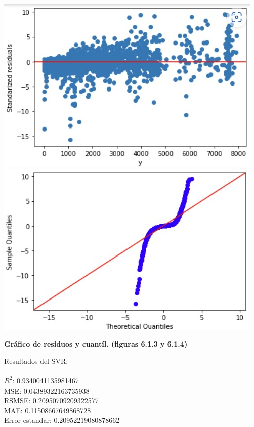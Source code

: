 \documentclass{article}
\begin{document}
                
                        \includegraphics[scale=0.6]{images/MLP_After_SS.jpg} 
                        \includegraphics[scale=0.6]{images/MLP_After_SS_Q.jpg} \\
                        \begin{center}
                            \textbf{Gráfico de residuos y cuantíl. (figuras 6.1.3 y 6.1.4)}
                        \end{center}
                        
                
            Resultados del SVR:\\
                    \\
                        $R^2$:  0.9340041135981467 \\
                        MSE:  0.04389322163735938 \\
                        RSMSE:  0.20950709209322577 \\
                        MAE:  0.11508667649868728 \\
                        Error estandar:  0.20952219080878662 \\
                
\end{document}

